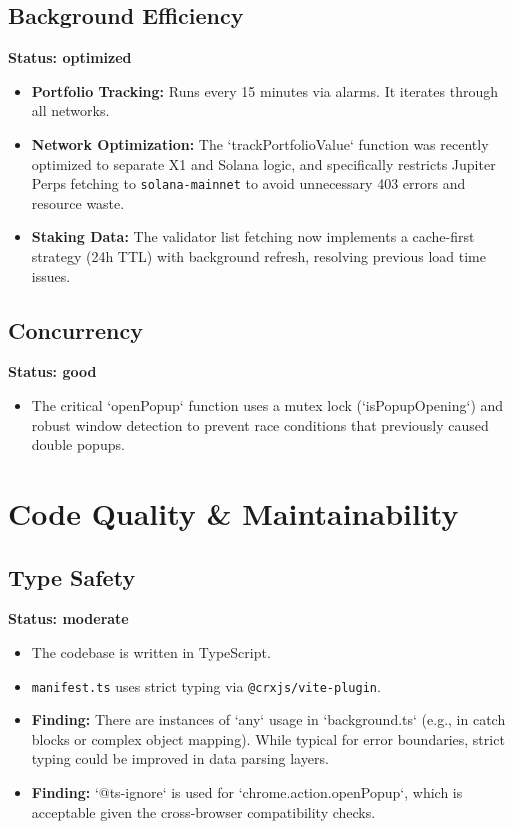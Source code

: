 \documentclass[11pt, a4paper]{article}
\begin{document}
\subsection{Background Efficiency}
\textbf{Status: optimized}
\begin{itemize}
    \item \textbf{Portfolio Tracking:} Runs every 15 minutes via alarms. It iterates through all networks.
    \item \textbf{Network Optimization:} The `trackPortfolioValue` function was recently optimized to separate X1 and Solana logic, and specifically restricts Jupiter Perps fetching to \texttt{solana-mainnet} to avoid unnecessary 403 errors and resource waste.
    \item \textbf{Staking Data:} The validator list fetching now implements a cache-first strategy (24h TTL) with background refresh, resolving previous load time issues.
\end{itemize}

\subsection{Concurrency}
\textbf{Status: good}
\begin{itemize}
    \item The critical `openPopup` function uses a mutex lock (`isPopupOpening`) and robust window detection to prevent race conditions that previously caused double popups.
\end{itemize}

\section{Code Quality & Maintainability}

\subsection{Type Safety}
\textbf{Status: moderate}
\begin{itemize}
    \item The codebase is written in TypeScript.
    \item \texttt{manifest.ts} uses strict typing via \texttt{@crxjs/vite-plugin}.
    \item \textbf{Finding:} There are instances of `any` usage in `background.ts` (e.g., in catch blocks or complex object mapping). While typical for error boundaries, strict typing could be improved in data parsing layers.
    \item \textbf{Finding:} `@ts-ignore` is used for `chrome.action.openPopup`, which is acceptable given the cross-browser compatibility checks.
\end{itemize}
\end{document}
